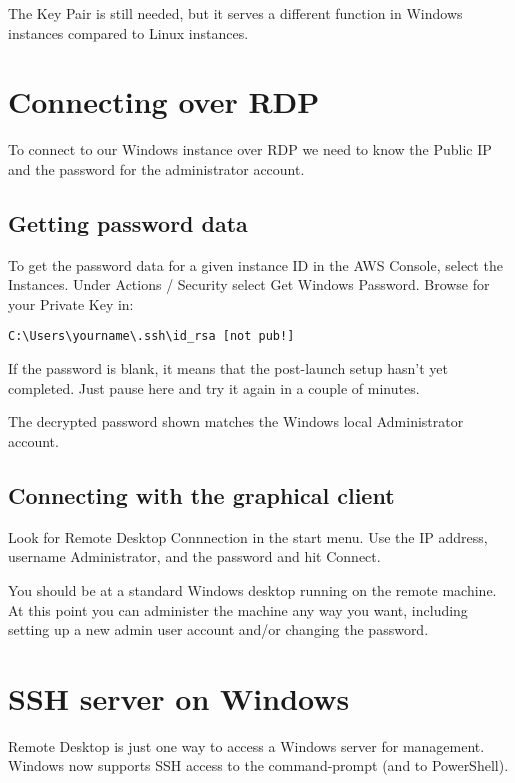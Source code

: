 The Key Pair is still needed, but it serves a different function in
Windows instances compared to Linux instances.


\section{Connecting over RDP}\label{connecting-over-rdp}

To connect to our Windows instance over RDP we need to know the Public
IP and the password for the administrator account.

\subsection{Getting password data}\label{getting-password-data}

To get the password data for a given instance ID in the AWS Console, select the Instances.
Under Actions / Security select Get Windows Password.
Browse for your Private Key in:
\begin{verbatim}
C:\Users\yourname\.ssh\id_rsa [not pub!]
\end{verbatim}

If the password is blank, it means that the post-launch setup hasn't yet
completed. Just pause here and try it again in a couple of minutes.

The decrypted password shown matches the Windows local Administrator
account.

\subsection{Connecting with the graphical
client}\label{connecting-with-the-graphical-client}

Look for Remote Desktop Connnection in the start menu. Use the IP
address, username Administrator, and the password and hit Connect.

You should be at a standard Windows desktop running on the remote
machine. At this point you can administer the machine any way you want,
including setting up a new admin user account and/or changing the
password.

\section{SSH server on Windows}\label{ssh-server-on-windows}

Remote Desktop is just one way to access a Windows server for
management. Windows now supports SSH access to the command-prompt (and
to PowerShell).

